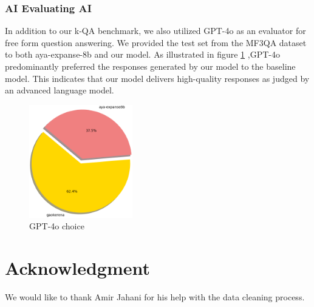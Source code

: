 \documentclass[conference]{IEEEtran}
\begin{document}
\subsubsection{AI Evaluating AI}
In addition to our k-QA benchmark, we also utilized GPT-4o
\cite{b19}
as an evaluator for free form question answering. We provided the test set from the MF3QA dataset to both aya-expanse-8b and our model. As illustrated in figure
\ref{fig2}
,GPT-4o predominantly preferred the responses generated by our model to the baseline model. This indicates that our model delivers high-quality responses as judged by an advanced language model.

\begin{figure}[htbp]
	\centerline{\includegraphics[width=0.4\textwidth]{fig2.png}}
	\caption{GPT-4o choice}
	\label{fig2}
\end{figure}
\section*{Acknowledgment}
We would like to thank Amir Jahani for his help with the data cleaning process.
\end{document}
